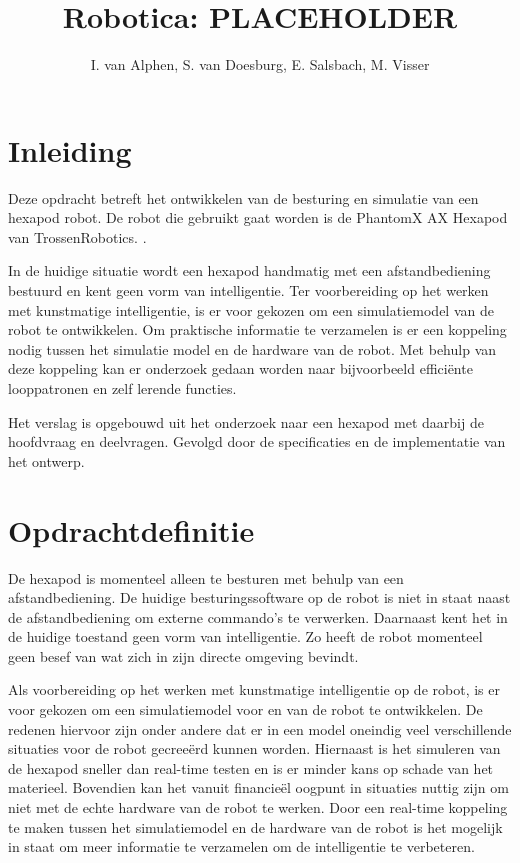 \documentclass[10pt,a4paper]{article}
\title{Robotica: PLACEHOLDER}
\author{I. van Alphen, S. van Doesburg, E.  Salsbach, M. Visser}
\begin{document}
\newpage 

\tableofcontents

\section{Inleiding}
Deze opdracht betreft het ontwikkelen van de besturing en simulatie van een hexapod robot.\cite{beroepsopdrachten} De robot die gebruikt gaat worden is de PhantomX AX Hexapod van TrossenRobotics. \cite{PhantomX AX Hexapod Kit}.

In de huidige situatie wordt een hexapod handmatig met een afstandbediening bestuurd en kent geen vorm van intelligentie. Ter voorbereiding op het werken met kunstmatige intelligentie, is er voor gekozen om een simulatiemodel van de robot te ontwikkelen. Om praktische informatie te verzamelen is er een koppeling nodig tussen het simulatie model en de hardware van de robot. Met behulp van deze koppeling kan er onderzoek gedaan worden naar bijvoorbeeld effici\"ente looppatronen en zelf lerende functies.

Het verslag is opgebouwd uit het onderzoek naar een hexapod met daarbij de hoofdvraag en deelvragen. Gevolgd door de specificaties en de implementatie van het ontwerp.

\newpage

\section{Opdrachtdefinitie} 
De hexapod is momenteel alleen te besturen met behulp van een afstandbediening. De huidige besturingssoftware op de robot is niet in staat naast de afstandbediening om externe commando's te verwerken. Daarnaast kent het in de huidige toestand geen vorm van intelligentie. Zo heeft de robot momenteel geen besef van wat zich in zijn directe omgeving bevindt.

Als voorbereiding op het werken met kunstmatige intelligentie op de robot, is er voor gekozen om een simulatiemodel voor en van de robot te ontwikkelen. De redenen hiervoor zijn onder andere dat er in een model oneindig veel verschillende situaties voor de robot gecree\"erd kunnen worden. Hiernaast is het simuleren van de hexapod sneller dan real-time testen en is er minder kans op schade van het materieel. Bovendien kan het vanuit financie\"el oogpunt in situaties nuttig zijn om niet met de echte hardware van de robot te werken. 
Door een real-time koppeling te maken tussen het simulatiemodel en de hardware van de robot is het mogelijk in staat om meer informatie te verzamelen om de intelligentie te verbeteren.
\end{document}
